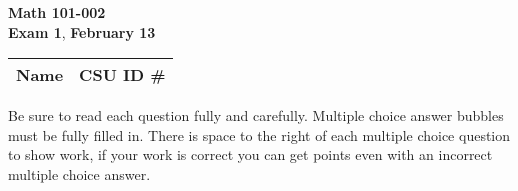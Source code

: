 \documentclass[12pt]{exam}
\newcommand{\class}{Math 101-002} %
\newcommand{\examnum}{Exam 1} %
\newcommand{\examdate}{February 13} %
\begin{document}
\pagestyle{plain}
\thispagestyle{empty}

\noindent
\textbf{\class}\\
\textbf{\examnum}, \textbf{\examdate} \\



\setlength{\tabcolsep}{3.5cm} %
\renewcommand{\arraystretch}{1.5}
\setlength\extrarowheight{1cm}
\begin{tabular}{ |c|c| } 
 \hline
 Name   & CSU ID \#  \\ 
 \hline
\end{tabular}
\vspace{10pt}

Be sure to read each question fully and carefully. Multiple choice answer bubbles must be fully filled in.  There is space to the right of each multiple choice question to show work, if your work is correct you can get points even with an incorrect multiple choice answer.  


\iffalse

    \foreach \s in {1,...,5}{
          \choice $P_\s$ has no power 
     }%
\fi
\end{document}
